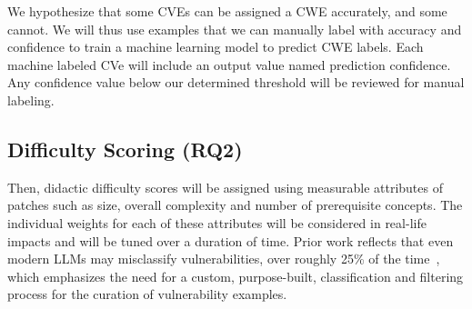 We hypothesize that some CVEs can be assigned a CWE accurately, and some cannot. We will thus use examples that we can manually label with accuracy and confidence to train a machine learning model to predict CWE labels. Each machine labeled CVe will include an output value named prediction confidence. Any confidence value below our determined threshold will be reviewed for manual labeling.

\subsection{Difficulty Scoring (RQ2)}
 Then, didactic difficulty scores will be assigned using measurable attributes of patches such as size, overall complexity and number of prerequisite concepts. The individual weights for each of these attributes will be considered in real-life impacts and will be tuned over a duration of time. Prior work reflects that even modern LLMs may misclassify vulnerabilities, over roughly 25\% of the time~\cite{ullah2024llms}, which emphasizes the need for a custom, purpose-built, classification and filtering process for the curation of vulnerability examples.